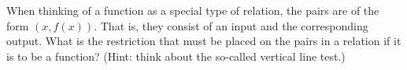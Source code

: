 \begin{exer}
When thinking of a function as a special type of relation, the pairs are of
the form $(x, f(x))$.  That is, they consist of an input and the corresponding
output.  What is the restriction that must be placed on the pairs in a 
relation if it is to be a function?  (Hint: think about the so-called 
vertical line test.)
\end{exer}

\newpage





%
%


